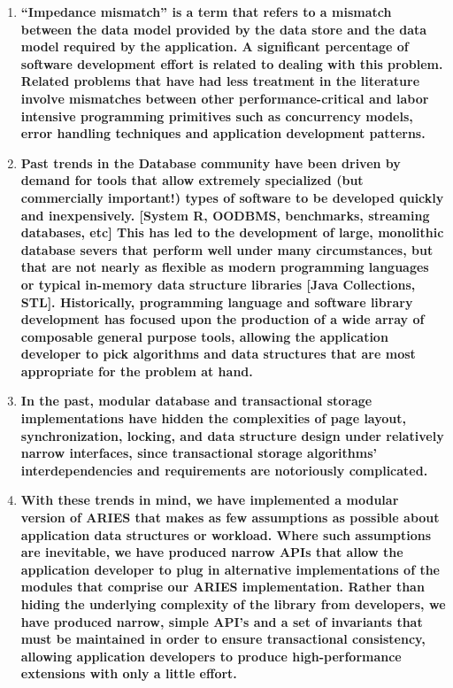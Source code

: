 \documentclass[letterpaper,english]{article}
\begin{document}
\begin{enumerate}
\begin{enumerate}
  \item {\bf {}``Impedance mismatch'' is a term that refers to a mismatch
  between the data model provided by the data store and the data model
  required by the application. A significant percentage of software
  development effort is related to dealing with this problem. Related
  problems that have had less treatment in the literature involve
  mismatches between other performance-critical and labor intensive
  programming primitives such as concurrency models, error handling
  techniques and application development patterns.}
  \item {\bf Past trends in the Database community have been driven by
  demand for tools that allow extremely specialized (but commercially
  important!)  types of software to be developed quickly and
  inexpensively. {[}System R, OODBMS, benchmarks, streaming databases,
  etc{]} This has led to the development of large, monolithic database
  severs that perform well under many circumstances, but that are not
  nearly as flexible as modern programming languages or typical
  in-memory data structure libraries {[}Java Collections,
  STL{]}. Historically, programming language and software library
  development has focused upon the production of a wide array of
  composable general purpose tools, allowing the application developer
  to pick algorithms and data structures that are most appropriate for
  the problem at hand.}

  \item {\bf In the past, modular database and transactional storage
  implementations have hidden the complexities of page layout,
  synchronization, locking, and data structure design under relatively
  narrow interfaces, since transactional storage algorithms'
  interdependencies and requirements are notoriously complicated.}

  \item {\bf With these trends in mind, we have implemented a modular
  version of ARIES that makes as few assumptions as possible about
  application data structures or workload. Where such assumptions are
  inevitable, we have produced narrow APIs that allow the application
  developer to plug in alternative implementations of the modules that
  comprise our ARIES implementation. Rather than hiding the underlying
  complexity of the library from developers, we have produced narrow,
  simple API's and a set of invariants that must be maintained in
  order to ensure transactional consistency, allowing application
  developers to produce high-performance extensions with only a little
  effort.}


\end{enumerate}
\end{enumerate}
\end{document}
